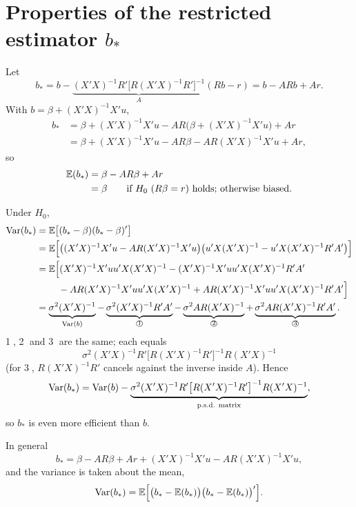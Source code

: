 \documentclass[11pt]{article}
\begin{document}
\section{Properties of the restricted estimator $b_{*}$}

Let
\[ b_{*} = b - \underbrace{(X'X)^{-1}R'\bigl[R(X'X)^{-1}R'\bigr]^{-1}}_{A}(Rb - r)
         = b - ARb + Ar. \]
With $b = \beta + (X'X)^{-1}X'u$,
\[
\begin{aligned}
b_{*} &= \beta + (X'X)^{-1}X'u - AR\bigl(\beta + (X'X)^{-1}X'u\bigr) + Ar\\
      &= \beta + (X'X)^{-1}X'u - AR\beta - AR(X'X)^{-1}X'u + Ar,
\end{aligned}
\]
so
\[
\begin{aligned}
\mathbb{E}(b_{*}) &= \beta - AR\beta + Ar\\
          &= \beta \qquad \text{if } H_{0}\ (R\beta = r) \text{ holds; otherwise biased.}
\end{aligned}
\]

Under $H_{0}$,
\[
\begin{aligned}
\operatorname{Var}(b_{*}) &= \mathbb{E}\bigl[(b_{*} - \beta)(b_{*} - \beta)'\bigr]\\
 &= \mathbb{E}\Bigl[\bigl((X'X)^{-1}X'u - AR(X'X)^{-1}X'u\bigr)\bigl(u'X(X'X)^{-1} - u'X(X'X)^{-1}R'A'\bigr)\Bigr]\\
 &= \mathbb{E}\Bigl[(X'X)^{-1}X'uu'X(X'X)^{-1} - (X'X)^{-1}X'uu'X(X'X)^{-1}R'A'\\
 &\qquad\ - AR(X'X)^{-1}X'uu'X(X'X)^{-1} + AR(X'X)^{-1}X'uu'X(X'X)^{-1}R'A'\Bigr]\\
 &= \underbrace{\sigma^{2}(X'X)^{-1}}_{\operatorname{Var}(b)}
    - \underbrace{\sigma^{2}(X'X)^{-1}R'A'}_{\text{\textcircled{\scriptsize 1}}}
    - \underbrace{\sigma^{2}AR(X'X)^{-1}}_{\text{\textcircled{\scriptsize 2}}}
    + \underbrace{\sigma^{2}AR(X'X)^{-1}R'A'}_{\text{\textcircled{\scriptsize 3}}}.
\end{aligned}
\]
\textcircled{\scriptsize 1}, \textcircled{\scriptsize 2} and \textcircled{\scriptsize 3} are the same; each equals
\[ \sigma^{2}(X'X)^{-1}R'\bigl[R(X'X)^{-1}R'\bigr]^{-1}R(X'X)^{-1} \]
(for \textcircled{\scriptsize 3}, $R(X'X)^{-1}R'$ cancels against the inverse inside $A$). Hence
\[ \operatorname{Var}(b_{*}) = \operatorname{Var}(b) - \underbrace{\sigma^{2}(X'X)^{-1}R'\bigl[R(X'X)^{-1}R'\bigr]^{-1}R(X'X)^{-1}}_{\text{p.s.d. matrix}}, \]
so $b_{*}$ is even more efficient than $b$.

In general
\[ b_{*} = \beta - AR\beta + Ar + (X'X)^{-1}X'u - AR(X'X)^{-1}X'u, \]
and the variance is taken about the mean,
\[ \operatorname{Var}(b_{*}) = \mathbb{E}\Bigl[\bigl(b_{*} - \mathbb{E}(b_{*})\bigr)\bigl(b_{*} - \mathbb{E}(b_{*})\bigr)'\Bigr]. \]
\end{document}
